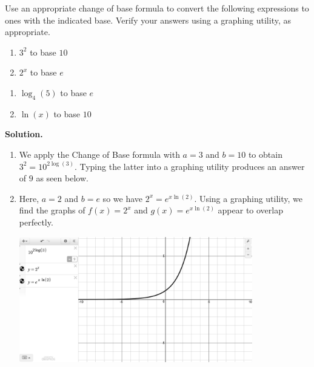 \documentclass{ximera}
\begin{document}
\begin{ex}  Use an appropriate change of base formula to convert the following expressions to ones with the indicated base.  Verify your answers using a graphing utility, as appropriate.
\begin{multicols}{2}
\begin{enumerate}

\item  $3^{2}$ to base $10$

\item  $2^{x}$ to base $e$

\setcounter{HW}{\value{enumi}}
\end{enumerate}
\end{multicols}

\begin{multicols}{2}
\begin{enumerate}
\setcounter{enumi}{\value{HW}}


\item $\log_{4}(5)$ to base $e$

\item $\ln(x)$ to base $10$

\end{enumerate}
\end{multicols}

{\bf Solution.}

\begin{enumerate}

\item  We apply the Change of Base formula with $a=3$ and $b=10$ to obtain $3^2 = 10^{2 \log(3)}$. Typing the latter into a graphing utility produces an answer of $9$ as seen below.

\item  Here, $a=2$ and $b = e$ so we have $2^{x} = e^{x \ln(2)}$.  Using a graphing utility, we find the graphs of $f(x) = 2^x$ and $g(x) = e^{x \ln(2)}$ appear to overlap perfectly.

\begin{center}

\includegraphics[width=4in]{./PropertiesofLogarithmsGraphics/LogProps01.jpg} 


\end{center}
\end{enumerate}
\end{ex}
\end{document}
